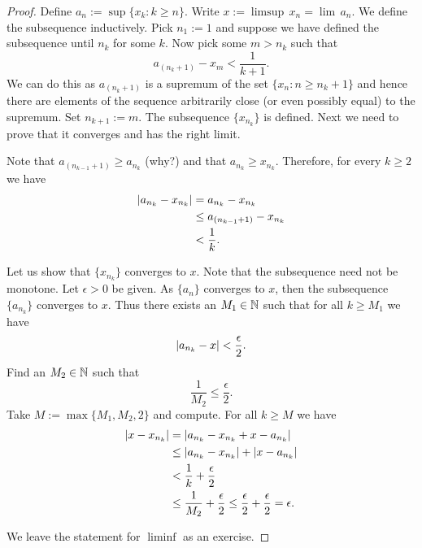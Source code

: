 \begin{proof}
Define $a_n := \sup \{ x_k : k \geq n \}$.
Write
$x := \limsup \, x_n = \lim\, a_n$.  We define the subsequence inductively.
Pick $n_1 := 1$ and suppose we have
defined the subsequence until $n_k$ for some $k$.  Now pick some $m > n_k$
such that
\begin{equation*}
a_{(n_k+1)} - x_m < \frac{1}{k+1} .
\end{equation*}
We can do this as $a_{(n_k+1)}$ is a supremum of the
set $\{ x_n : n \geq n_k + 1 \}$ and hence there are elements
of the sequence arbitrarily close (or even possibly equal) to the supremum.
Set $n_{k+1} :=  m$.  The subsequence $\{ x_{n_k} \}$ is defined.  Next we
need to prove that it converges and has the right limit.

Note that
$a_{(n_{k-1}+1)} \geq a_{n_k}$ (why?) and that $a_{n_{k}} \geq x_{n_k}$.
Therefore, for every $k \geq 2$ we have
\begin{equation*}
\begin{split}
\left\lvert {a_{n_k} - x_{n_k}} \right\rvert & = 
a_{n_k} - x_{n_k}
\\
& \leq
a_{(n_{k-1}+1)} - x_{n_k}
\\
& < \frac{1}{k} .
\end{split}
\end{equation*}

Let us show that $\{ x_{n_k} \}$ converges to $x$.
Note that the subsequence need not be monotone.  Let $\epsilon > 0$ be given.
As $\{ a_n \}$ converges to $x$, then the subsequence
$\{ a_{n_k} \}$ converges to $x$.
Thus there exists an $M_1 \in {\mathbb{N}}$
such that for all $k \geq M_1$ we have
\begin{equation*}
\left\lvert {a_{n_k} - x} \right\rvert < \frac{\epsilon}{2} .
\end{equation*}
Find an $M_2 \in {\mathbb{N}}$ such that
\begin{equation*}
\frac{1}{M_2} \leq \frac{\epsilon}{2}.
\end{equation*}
Take $M := \max \{M_1 , M_2 , 2 \}$ and compute.  For all $k \geq M$
we have
\begin{equation*}
\begin{split}
\left\lvert {x- x_{n_k}} \right\rvert & =
\left\lvert {a_{n_k} - x_{n_k} + x - a_{n_k}} \right\rvert
\\
& \leq \left\lvert {a_{n_k} - x_{n_k}} \right\rvert + \left\lvert {x - a_{n_k}} \right\rvert
\\
& < \frac{1}{k} + \frac{\epsilon}{2}
\\
& \leq \frac{1}{M_2} + \frac{\epsilon}{2} \leq \frac{\epsilon}{2} +
\frac{\epsilon}{2} = \epsilon .
\end{split}
\end{equation*}

We leave the statement for $\liminf$ as an exercise.
\end{proof}

